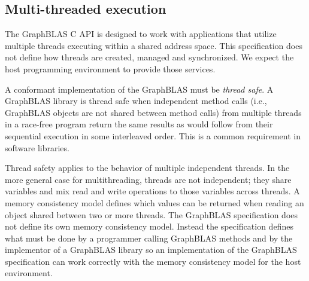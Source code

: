 \subsection{Multi-threaded execution}
\label{Sec:MultiThread}

The GraphBLAS C API is designed to work with applications that
utilize multiple threads executing within a shared address space.
This specification does not define how threads are created, managed and
synchronized.  We expect the host programming environment to provide
those services. 

A conformant implementation of the GraphBLAS must be \emph{thread safe}.  A GraphBLAS library is thread safe when independent
method calls (i.e., GraphBLAS objects are not shared between method calls) from multiple threads in a race-free program
return the same results as would follow from their sequential execution in some interleaved order.   This is a common requirement in 
software libraries. 

Thread safety applies to the behavior of multiple independent threads.  In the more general case for multithreading, 
threads are not independent; they share variables and mix read and write operations to those variables
across threads.  A memory consistency model defines which values can be returned when reading an 
object shared between two or more threads.  The GraphBLAS specification does not define its own memory consistency model. Instead
the specification defines what must be done by a programmer calling GraphBLAS methods and by the implementor of 
a GraphBLAS library so an implementation of the GraphBLAS specification 
can work correctly with the memory consistency model for the host environment. 

